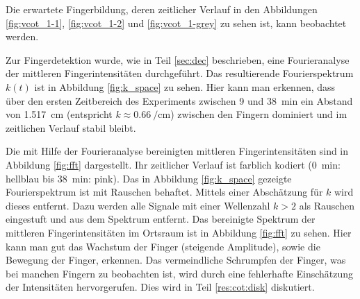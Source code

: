 Die erwartete Fingerbildung, deren zeitlicher Verlauf in den Abbildungen \ref{fig:vcot_1-1}, \ref{fig:vcot_1-2} und \ref{fig:vcot_1-grey} zu sehen ist, kann beobachtet werden.




Zur Fingerdetektion wurde, wie in Teil \ref{sec:dec} beschrieben, eine Fourieranalyse der mittleren Fingerintensitäten durchgeführt. Das resultierende Fourierspektrum $k(t)$ ist in Abbildung \ref{fig:k_space} zu sehen. Hier kann man erkennen, dass über den ersten Zeitbereich des Experiments zwischen 9 und \SI{38}{\minute} ein Abstand von \SI[round-precision=2]{1,517}{\centi\meter} (entspricht $k \approx \SI[round-precision=2]{0,66}{\per\centi\meter}$) zwischen den Fingern dominiert und im zeitlichen Verlauf stabil bleibt. 

Die mit Hilfe der Fourieranalyse bereinigten mittleren Fingerintensitäten sind in Abbildung \ref{fig:fft} dargestellt. Ihr zeitlicher Verlauf ist farblich kodiert (\SI{0}{\minute}: hellblau bis \mbox{\SI{38}{\minute}}: pink).  
Das in Abbildung \ref{fig:k_space} gezeigte Fourierspektrum ist mit Rauschen behaftet. Mittels einer Abschätzung für $k$ wird dieses entfernt. Dazu werden alle Signale mit einer Wellenzahl $k > 2$ als Rauschen eingestuft und aus dem Spektrum entfernt. Das bereinigte Spektrum der mittleren Fingerintensitäten im Ortsraum ist in Abbildung \ref{fig:fft} zu sehen.
Hier kann man gut das Wachstum der Finger (steigende Amplitude), sowie die Bewegung der Finger, erkennen. 
Das vermeindliche Schrumpfen der Finger, was bei manchen Fingern zu beobachten ist, wird durch eine fehlerhafte Einschätzung der Intensitäten hervorgerufen. Dies wird in Teil \ref{res:cot:disk} diskutiert. %


